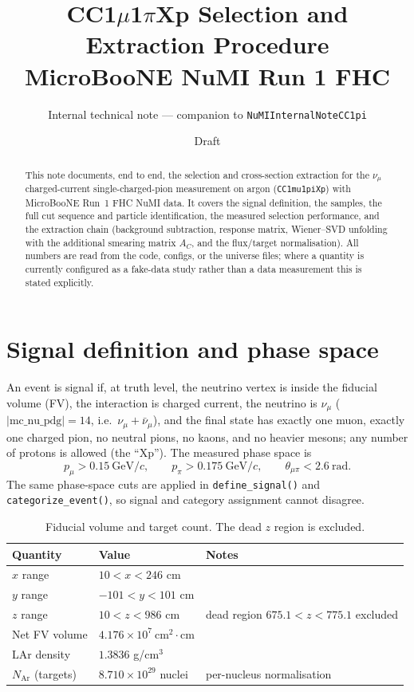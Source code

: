 \documentclass[11pt]{article}
\title{\bf CC1$\mu$1$\pi$Xp Selection and Extraction Procedure\\[2pt]
\large MicroBooNE NuMI Run 1 FHC}
\author{Internal technical note --- companion to \texttt{NuMIInternalNoteCC1pi}}
\date{Draft}
\newcommand{\numu}{\nu_\mu}
\newcommand{\cmsq}{\mathrm{cm}^2}
\begin{document}
\maketitle

\begin{abstract}
\noindent
This note documents, end to end, the selection and cross-section extraction for
the $\numu$ charged-current single-charged-pion measurement on argon
(\texttt{CC1mu1piXp}) with MicroBooNE Run~1 FHC NuMI data. It covers the signal
definition, the samples, the full cut sequence and particle identification, the
measured selection performance, and the extraction chain (background
subtraction, response matrix, Wiener--SVD unfolding with the additional smearing
matrix $A_C$, and the flux/target normalisation). All numbers are read from the
code, configs, or the universe files; where a quantity is currently configured
as a fake-data study rather than a data measurement this is stated explicitly.
\end{abstract}

\section{Signal definition and phase space}
An event is signal if, at truth level, the neutrino vertex is inside the
fiducial volume (FV), the interaction is charged current, the neutrino is
$\numu$ ($|\mathrm{mc\_nu\_pdg}|=14$, i.e.\ $\numu+\bar\numu$), and the final
state has exactly one muon, exactly one charged pion, no neutral pions, no
kaons, and no heavier mesons; any number of protons is allowed (the ``Xp'').
The measured phase space is
\begin{equation}
p_\mu > 0.15~\mathrm{GeV}/c,\qquad
p_\pi > 0.175~\mathrm{GeV}/c,\qquad
\theta_{\mu\pi} < 2.6~\mathrm{rad}.
\end{equation}
The same phase-space cuts are applied in \texttt{define\_signal()} and
\texttt{categorize\_event()}, so signal and category assignment cannot disagree.

\begin{table}[htbp]\centering
\caption{Fiducial volume and target count. The dead $z$ region is excluded.}
\begin{tabular}{lll}
\toprule
Quantity & Value & Notes\\
\midrule
$x$ range & $10 < x < 246$ cm & \\
$y$ range & $-101 < y < 101$ cm & \\
$z$ range & $10 < z < 986$ cm & dead region $675.1<z<775.1$ excluded\\
Net FV volume & $4.176\times10^{7}~\cmsq\cdot$cm & \\
LAr density & $1.3836$ g/cm$^3$ & \\
$N_{\mathrm{Ar}}$ (targets) & $8.710\times10^{29}$ nuclei & per-nucleus normalisation\\
\bottomrule
\end{tabular}
\end{table}
\end{document}
